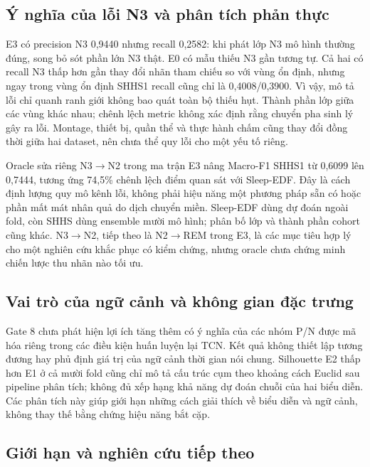 \subsection{Ý nghĩa của lỗi N3 và phân tích phản thực}

E3 có precision N3 0,9440 nhưng recall 0,2582: khi phát lớp N3 mô hình thường đúng, song bỏ sót phần lớn N3 thật. E0 có mẫu thiếu N3 gần tương tự. Cả hai có recall N3 thấp hơn gần thay đổi nhãn tham chiếu so với vùng ổn định, nhưng ngay trong vùng ổn định SHHS1 recall cũng chỉ là 0,4008/0,3900. Vì vậy, mô tả lỗi chỉ quanh ranh giới không bao quát toàn bộ thiếu hụt. Thành phần lớp giữa các vùng khác nhau; chênh lệch metric không xác định rằng chuyển pha sinh lý gây ra lỗi. Montage, thiết bị, quần thể và thực hành chấm cũng thay đổi đồng thời giữa hai dataset, nên chưa thể quy lỗi cho một yếu tố riêng.

Oracle sửa riêng N3$\rightarrow$N2 trong ma trận E3 nâng Macro-F1 SHHS1 từ 0,6099 lên 0,7444, tương ứng 74,5\% chênh lệch điểm quan sát với Sleep-EDF. Đây là cách định lượng quy mô kênh lỗi, không phải hiệu năng một phương pháp sẵn có hoặc phần mất mát nhân quả do dịch chuyển miền. Sleep-EDF dùng dự đoán ngoài fold, còn SHHS dùng ensemble mười mô hình; phân bố lớp và thành phần cohort cũng khác. N3$\rightarrow$N2, tiếp theo là N2$\rightarrow$REM trong E3, là các mục tiêu hợp lý cho một nghiên cứu khắc phục có kiểm chứng, nhưng oracle chưa chứng minh chiến lược thu nhãn nào tối ưu.

\subsection{Vai trò của ngữ cảnh và không gian đặc trưng}

Gate 8 chưa phát hiện lợi ích tăng thêm có ý nghĩa của các nhóm P/N được mã hóa riêng trong các điều kiện huấn luyện lại TCN. Kết quả không thiết lập tương đương hay phủ định giá trị của ngữ cảnh thời gian nói chung. Silhouette E2 thấp hơn E1 ở cả mười fold cũng chỉ mô tả cấu trúc cụm theo khoảng cách Euclid sau pipeline phân tích; không đủ xếp hạng khả năng dự đoán chuỗi của hai biểu diễn. Các phân tích này giúp giới hạn những cách giải thích về biểu diễn và ngữ cảnh, không thay thế bằng chứng hiệu năng bắt cặp.

\subsection{Giới hạn và nghiên cứu tiếp theo}

